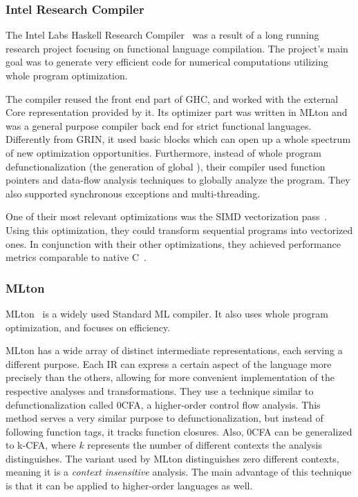 \documentclass[main.tex]{subfiles}
\begin{document}
	\subsubsection{Intel Research Compiler}
	
	The Intel Labs Haskell Research Compiler~\cite{hrc} was a result of a long running research project focusing on functional language compilation. The project's main goal was to generate very efficient code for numerical computations utilizing whole program optimization.
	
	The compiler reused the front end part of GHC, and worked with the external Core representation provided by it. Its optimizer part was written in MLton and was a general purpose compiler back end for strict functional languages. Differently from GRIN, it used basic blocks which can open up a whole spectrum of new optimization opportunities. Furthermore, instead of whole program defunctionalization (the generation of global ), their compiler used function pointers and data-flow analysis techniques to globally analyze the program. They also supported synchronous exceptions and multi-threading.
	
	One of their most relevant optimizations was the SIMD vectorization pass~\cite{hrc-simd}. Using this optimization, they could transform sequential programs into vectorized ones. In conjunction with their other optimizations, they achieved performance metrics comparable to native C~\cite{haskell-gap}.
	
	\subsubsection{MLton}
	
	MLton~\cite{mlton} is a widely used Standard ML compiler. It also uses whole program optimization, and focuses on efficiency.
	
	MLton has a wide array of distinct intermediate representations, each serving a different purpose. Each IR can express a certain aspect of the language more precisely than the others, allowing for more convenient implementation of the respective analyses and transformations. They use a technique similar to defunctionalization called 0CFA, a higher-order control flow analysis. This method serves a very similar purpose to defunctionalization, but instead of following function tags, it tracks function closures. Also, 0CFA can be generalized to k-CFA, where $k$ represents the number of different contexts the analysis distinguishes. The variant used by MLton distinguishes zero different contexts, meaning it is a \textit{context insensitive} analysis. The main advantage of this technique is that it can be applied to higher-order languages as well. 
	
\end{document}
